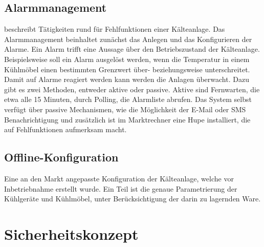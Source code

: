 \documentclass[11pt,a4paper]{report}
\begin{document}
\subsection{Alarmmanagement} beschreibt Tätigkeiten rund für Fehlfunktionen einer Kälteanlage. Das Alarmmanagement beinhaltet zunächst das Anlegen und das Konfigurieren der Alarme. Ein Alarm trifft eine Aussage über den Betriebszustand der Kälteanlage. Beispielsweise soll ein Alarm ausgelöst werden, wenn die Temperatur in einem Kühlmöbel einen bestimmten Grenzwert über- beziehungsweise unterschreitet. Damit auf Alarme reagiert werden kann werden die Anlagen überwacht. Dazu gibt es zwei Methoden, entweder aktive oder passive. Aktive sind Fernwarten, die etwa alle 15 Minuten, durch Polling, die Alarmliste abrufen. Das System selbst verfügt über passive Mechanismen, wie die Möglichkeit der E-Mail oder SMS Benachrichtigung und zusätzlich ist im Marktrechner eine Hupe installiert, die auf Fehlfunktionen aufmerksam macht. 

\subsection{Offline-Konfiguration} Eine an den Markt angepasste Konfiguration der Kälteanlage, welche vor Inbetriebnahme erstellt wurde. Ein Teil ist die genaue Parametrierung der Kühlgeräte und Kühlmöbel, unter Berücksichtigung der darin zu lagernden Ware.

\section{Sicherheitskonzept}
\end{document}
